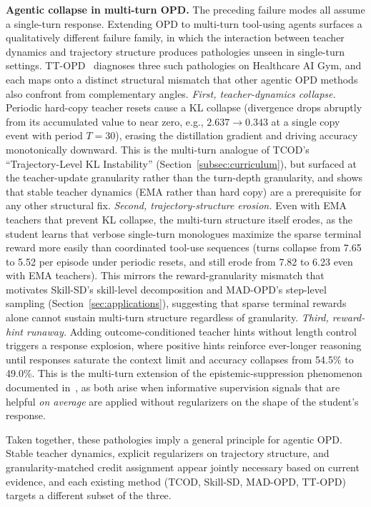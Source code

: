 \documentclass{article} %
\begin{document}
\textbf{Agentic collapse in multi-turn OPD.} The preceding failure modes all assume a single-turn response. Extending OPD to multi-turn tool-using agents surfaces a qualitatively different failure family, in which the interaction between teacher dynamics and trajectory structure produces pathologies unseen in single-turn settings. TT-OPD~\citep{2605.02943} diagnoses three such pathologies on Healthcare AI Gym, and each maps onto a distinct structural mismatch that other agentic OPD methods also confront from complementary angles. \emph{First, teacher-dynamics collapse.} Periodic hard-copy teacher resets cause a KL collapse (divergence drops abruptly from its accumulated value to near zero, e.g., $2.637 \to 0.343$ at a single copy event with period $T{=}30$), erasing the distillation gradient and driving accuracy monotonically downward. This is the multi-turn analogue of TCOD's ``Trajectory-Level KL Instability'' (Section~\ref{subsec:curriculum}), but surfaced at the teacher-update granularity rather than the turn-depth granularity, and shows that stable teacher dynamics (EMA rather than hard copy) are a prerequisite for any other structural fix. \emph{Second, trajectory-structure erosion.} Even with EMA teachers that prevent KL collapse, the multi-turn structure itself erodes, as the student learns that verbose single-turn monologues maximize the sparse terminal reward more easily than coordinated tool-use sequences (turns collapse from 7.65 to 5.52 per episode under periodic resets, and still erode from 7.82 to 6.23 even with EMA teachers). This mirrors the reward-granularity mismatch that motivates Skill-SD's skill-level decomposition and MAD-OPD's step-level sampling (Section~\ref{sec:applications}), suggesting that sparse terminal rewards alone cannot sustain multi-turn structure regardless of granularity. \emph{Third, reward-hint runaway.} Adding outcome-conditioned teacher hints without length control triggers a response explosion, where positive hints reinforce ever-longer reasoning until responses saturate the context limit and accuracy collapses from 54.5\% to 49.0\%. This is the multi-turn extension of the epistemic-suppression phenomenon documented in~\citet{2603.24472}, as both arise when informative supervision signals that are helpful \emph{on average} are applied without regularizers on the shape of the student's response.

Taken together, these pathologies imply a general principle for agentic OPD. Stable teacher dynamics, explicit regularizers on trajectory structure, and granularity-matched credit assignment appear jointly necessary based on current evidence, and each existing method (TCOD, Skill-SD, MAD-OPD, TT-OPD) targets a different subset of the three.
\end{document}
